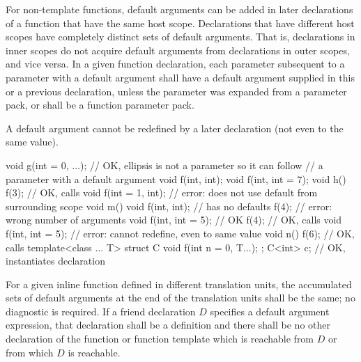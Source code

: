 \pnum
For non-template functions, default arguments can be added in later
declarations of a
function that have the same host scope.
Declarations that have different
host scopes have completely distinct sets of default arguments.
That
is, declarations in inner scopes do not acquire default
arguments from declarations in outer scopes, and vice versa.
In
a given function declaration, each parameter subsequent to a
parameter with a default argument shall have a default argument
supplied in this or a previous declaration,
unless the parameter was expanded from a parameter pack,
or shall be a function parameter pack.
\begin{note}
A default argument
cannot be redefined by a later declaration
(not even to the same value).
\end{note}
\begin{example}
\begin{codeblock}
void g(int = 0, ...);           // OK, ellipsis is not a parameter so it can follow
                                // a parameter with a default argument
void f(int, int);
void f(int, int = 7);
void h() {
  f(3);                         // OK, calls 
  void f(int = 1, int);         // error: does not use default from surrounding scope
}
void m() {
  void f(int, int);             // has no defaults
  f(4);                         // error: wrong number of arguments
  void f(int, int = 5);         // OK
  f(4);                         // OK, calls 
  void f(int, int = 5);         // error: cannot redefine, even to same value
}
void n() {
  f(6);                         // OK, calls 
}
template<class ... T> struct C {
  void f(int n = 0, T...);
};
C<int> c;                       // OK, instantiates declaration 
\end{codeblock}
\end{example}
For a given inline function defined in different translation units,
the accumulated sets of default arguments at the end of the
translation units shall be the same; no diagnostic is required.
If a friend declaration $D$ specifies a default argument expression,
that declaration shall be a definition and there shall be no other
declaration of the function or function template
which is reachable from $D$ or from which $D$ is reachable.

